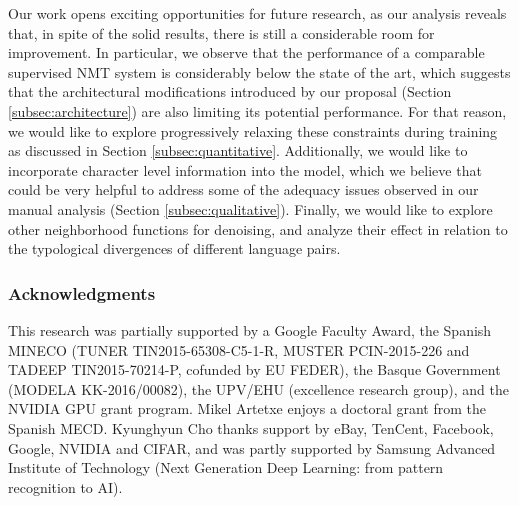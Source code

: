 \documentclass{article} \usepackage{iclr2018_conference,times}
\begin{document}
Our work opens exciting opportunities for future research, as our analysis reveals that, in spite of the solid results, there is still a considerable room for improvement. In particular, we observe that the performance of a comparable supervised NMT system is considerably below the state of the art, which suggests that the architectural modifications introduced by our proposal (Section \ref{subsec:architecture}) are also limiting its potential performance. For that reason, we would like to explore progressively relaxing these constraints during training as discussed in Section \ref{subsec:quantitative}. Additionally, we would like to incorporate character level information into the model, which we believe that could be very helpful to address some of the adequacy issues observed in our manual analysis (Section \ref{subsec:qualitative}). Finally, we would like to explore other neighborhood functions for denoising, and analyze their effect in relation to the typological divergences of different language pairs.


\subsubsection*{Acknowledgments}

This research was partially supported by a Google Faculty Award, the Spanish MINECO (TUNER TIN2015-65308-C5-1-R, MUSTER PCIN-2015-226 and TADEEP TIN2015-70214-P, cofunded by EU FEDER), the Basque Government (MODELA KK-2016/00082), the UPV/EHU  (excellence research group), and the NVIDIA GPU grant program. Mikel Artetxe enjoys a doctoral grant from the Spanish MECD. Kyunghyun Cho thanks support by eBay, TenCent, Facebook, Google, NVIDIA and CIFAR, and was partly supported by Samsung Advanced Institute of Technology (Next Generation Deep Learning: from pattern recognition to AI).




\end{document}
